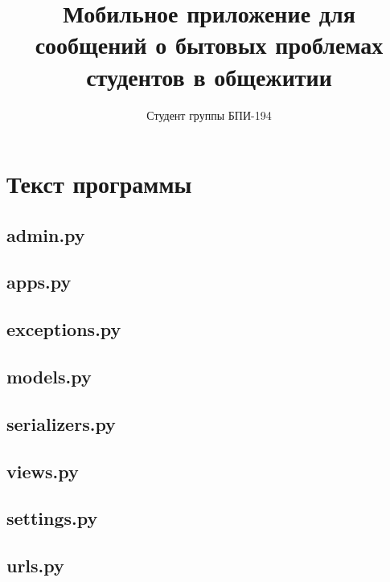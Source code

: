 \documentclass{../includes/TechDoc}
\title{Мобильное приложение для сообщений о бытовых проблемах студентов в общежитии}
\author{Студент группы БПИ-194}{В. А. Анненков}
\begin{document}
    \maketitle

    \tableofcontents


    \section{Текст программы}

    \subsection{admin.py}
    

    \subsection{apps.py}
    

    \subsection{exceptions.py}
    

    \subsection{models.py}
    

    \subsection{serializers.py}
    

    \subsection{views.py}
    

    \subsection{settings.py}
    

    \subsection{urls.py}
    


    \registrationList
\end{document}
